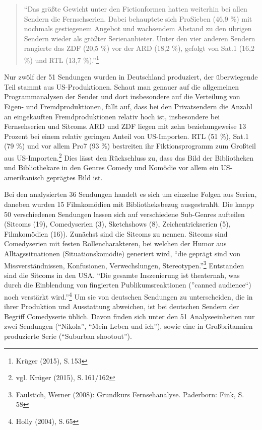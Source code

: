 \begin{flushleft}
\begin{quote}
\enquote{Das größte Gewicht unter den Fictionformen hatten weiterhin bei
allen Sendern die Fernsehserien. Dabei behauptete sich ProSieben (46,9
\%) mit nochmals gestiegenem Angebot und wachsendem Abstand zu den
übrigen Sendern wieder als größter Serienanbieter. Unter den vier
anderen Sendern rangierte das ZDF (20,5 \%) vor der ARD (18,2 \%),
gefolgt von Sat.1 (16,2 \%) und RTL (13,7 \%).}\footnote{Krüger (2015),
  S.\,153}
\end{quote}
\end{flushleft}

Nur zwölf der 51 Sendungen wurden in Deutschland produziert, der
überwiegende Teil stammt aus US-Produktionen. Schaut man genauer auf die
allgemeinen Programmanalysen der Sender und dort insbesondere auf die
Verteilung von Eigen- und Fremdproduktionen, fällt auf, dass bei den
Privatsendern die Anzahl an eingekauften Fremdproduktionen relativ hoch
ist, insbesondere bei Fernsehserien und Sitcoms.\,ARD und ZDF liegen mit
zehn beziehungsweise 13 Prozent bei einem relativ geringen Anteil von
US-Importen. RTL (51 \%), Sat.1 (79 \%) und vor allem Pro7 (93 \%)
bestreiten ihr Fiktionsprogramm zum Großteil aus US-Importen.\footnote{vgl.
  Krüger (2015), S.\,161/162} Dies lässt den Rückschluss zu, dass das
Bild der Bibliotheken und Bibliothekare in den Genres Comedy und Komödie
vor allem ein US-amerikanisch geprägtes Bild ist.

Bei den analysierten 36 Sendungen handelt es sich um einzelne Folgen aus
Serien, daneben wurden 15 Filmkomödien mit Bibliotheksbezug
ausgestrahlt. Die knapp 50 verschiedenen Sendungen lassen sich auf
verschiedene Sub-Genres aufteilen (Sitcoms (19), Comedyserien (3),
Sketchshows (8), Zeichentrickserien (5), Filmkomödien (16)). Zunächst
sind die Sitcoms zu nennen. Sitcoms sind Comedyserien mit festen
Rollencharakteren, bei welchen der Humor aus Alltagssituationen
(Situationskomödie) generiert wird, \enquote{die geprägt sind von
Missverständnissen, Konfusionen, Verwechslungen, Stereotypen.}\footnote{Faulstich,
  Werner (2008): Grundkurs Fernsehanalyse. Paderborn: Fink, S.\,58}
Entstanden sind die Sitcoms in den USA. \enquote{Die gesamte
Inszenierung ist theaternah, was durch die Einblendung von fingierten
Publikumsreaktionen (}canned audience\enquote{) noch verstärkt
wird.}\footnote{Holly (2004), S.\,65} Um sie von deutschen Sendungen zu
unterscheiden, die in ihrer Produktion und Ausstattung abweichen, ist
bei deutschen Sendern der Begriff Comedyserie üblich. Davon finden sich
unter den 51 Analyseeinheiten nur zwei Sendungen (\enquote{Nikola},
\enquote{Mein Leben und ich}), sowie eine in Großbritannien produzierte
Serie (\enquote{Suburban shootout}).

